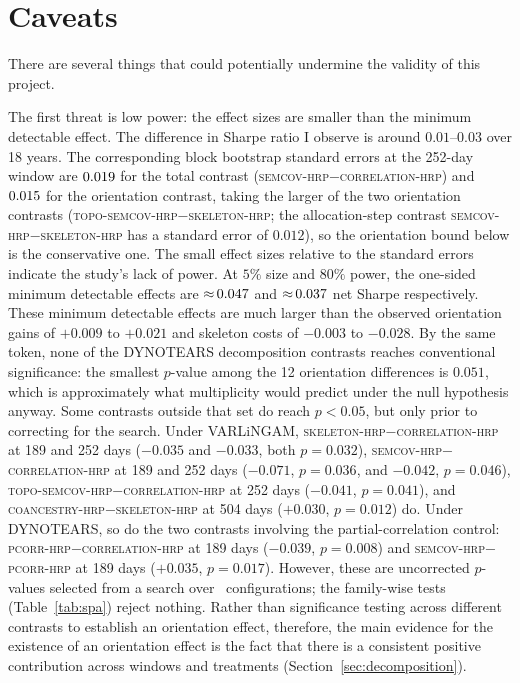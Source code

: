 \documentclass[11pt, a4paper]{report}
\newcommand{\corrhrp}{\textsc{correlation-hrp}}
\newcommand{\skelhrp}{\textsc{skeleton-hrp}}
\newcommand{\semcovhrp}{\textsc{semcov-hrp}}
\newcommand{\toposemcovhrp}{\textsc{topo-semcov-hrp}}
\newcommand{\pcorrhrp}{\textsc{pcorr-hrp}}
\newcommand{\coanchrp}{\textsc{coancestry-hrp}}
\begin{document}
\section{Caveats}
\label{sec:caveats}

There are several things that could potentially undermine the validity of this project.

The first threat is low power: the effect sizes are smaller than the minimum detectable effect.
The difference in Sharpe ratio I observe is around $0.01$--$0.03$ over 18 years.
The corresponding block bootstrap standard errors at the 252-day window are $0.019$ for the total contrast (\semcovhrp{}$-$\corrhrp{}) and $0.015$ for the orientation contrast, taking the larger of the two orientation contrasts (\toposemcovhrp{}$-$\skelhrp{}; the allocation-step contrast \semcovhrp{}$-$\skelhrp{} has a standard error of $0.012$), so the orientation bound below is the conservative one.
The small effect sizes relative to the standard errors indicate the study's lack of power.
At $5\%$ size and $80\%$ power, the one-sided minimum detectable effects
are ${\approx}\,0.047$ and
${\approx}\,0.037$ net Sharpe respectively.
These minimum detectable effects are much larger than the observed orientation gains of $+0.009$ to $+0.021$ and skeleton costs of $-0.003$ to $-0.028$.
By the same token, none of the DYNOTEARS decomposition contrasts reaches conventional significance: the smallest $p$-value among the 12 orientation differences is $0.051$, which is approximately what multiplicity would predict under the null hypothesis anyway.
Some contrasts outside that set do reach $p<0.05$, but only prior to correcting for the search. Under VARLiNGAM, \skelhrp{}$-$\corrhrp{} at 189 and 252 days ($-0.035$ and $-0.033$, both $p=0.032$), \semcovhrp{}$-$\corrhrp{} at 189 and 252 days ($-0.071$, $p=0.036$, and $-0.042$, $p=0.046$), \toposemcovhrp{}$-$\corrhrp{} at 252 days ($-0.041$, $p=0.041$), and \coanchrp{}$-$\skelhrp{} at 504 days ($+0.030$, $p=0.012$) do. Under DYNOTEARS, so do the two contrasts involving the partial-correlation control: \pcorrhrp{}$-$\corrhrp{} at 189 days ($-0.039$, $p=0.008$) and \semcovhrp{}$-$\pcorrhrp{} at 189 days ($+0.035$, $p=0.017$). However, these are uncorrected $p$-values selected from a search over \rsNtrials\ configurations; the family-wise tests (Table~\ref{tab:spa}) reject nothing.
Rather than significance testing across different contrasts to establish an orientation effect, therefore, the main evidence for the existence of an orientation effect is the fact that there is a consistent positive contribution across windows and
treatments (Section~\ref{sec:decomposition}).
\end{document}
